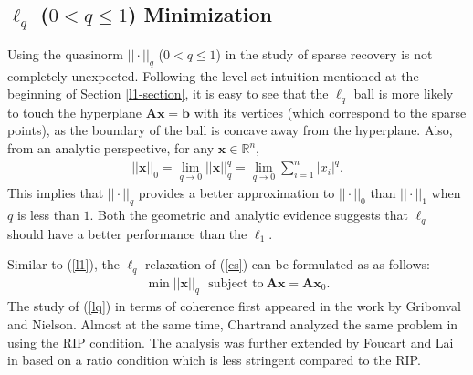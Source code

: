 \documentclass[11pt]{article}
\numberwithin{equation}{section}
\theoremstyle{plain}
\theoremstyle{definition}
\def\R{{\mathbb R}}
\def\R{{\mathbb R}}
\def\A{{\mathbf A}}
\def\x{{\mathbf x}}
\def\b{{\mathbf b}}
\begin{document}
\subsection{$\ell_q$ ($0<q\leq 1$) Minimization }

Using the quasinorm $|| \cdot||_q$ ($0<q\leq 1$) in the study of sparse recovery is not completely unexpected. Following the level set intuition mentioned at the beginning of Section \ref{l1-section}, it is easy to see that the $\ell_q$ ball is more likely to touch the hyperplane $\A\x=\b$ with its vertices (which correspond to the sparse points), as the boundary of the ball is concave away from the hyperplane. Also, from an analytic perspective, for any $\x\in\R^n$, 
\begin{align*}
||\x||_0 = \lim_{q\rightarrow 0}||\x||^q_q=\lim_{q\rightarrow 0}\sum_{i=1}^n|x_i|^q. 
\end{align*}
This implies that $|| \cdot||_q$ provides a better approximation to $|| \cdot||_0$ than $|| \cdot||_1$ when $q$ is less than $1$. Both the geometric and analytic evidence suggests that $\ell_q$ should have a better performance than the $\ell_1$. 

Similar to (\ref{l1}), the $\ell_q$ relaxation of (\ref{cs}) can be formulated as as follows:
\begin{align}
\min ||\x||_q \ \ \ \text{subject to}\ \A\x=\A\x_0.\label{lq}
\end{align}
The study of (\ref{lq}) in terms of coherence first appeared in the work \cite{gribonval2007highly} by Gribonval and Nielson. Almost at the same time, Chartrand analyzed the same problem in \cite{chartrand2007exact} using the RIP condition. The analysis was further extended  by Foucart and Lai in \cite{foucart2009sparsest} based on a ratio condition which is less stringent compared to the RIP.   
\end{document}
